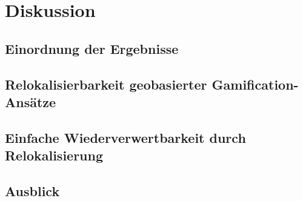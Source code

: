 \chapter{Diskussion}
\label{sec:S7_Diskussion}

\section{Einordnung der Ergebnisse}

\section{Relokalisierbarkeit geobasierter Gamification-Ansätze}

\section{Einfache Wiederverwertbarkeit durch Relokalisierung}

\section{Ausblick}